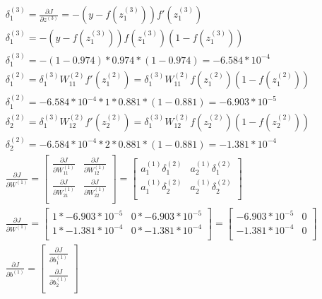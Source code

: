 \documentclass[leqno]{article}
\begin{document}
\begin{gather*}
\begin{split}
&\delta_1^{(3)} = \frac{\partial J}{\partial z^{(3)}} = -(y - f(z_1^{(3)}))f'(z_1^{(3)}) \\ 
&\delta_1^{(3)} =  -(y - f(z_1^{(3)}))f(z_1^{(3)})(1 - f(z_1^{(3)}))\\
&\delta_1^{(3)} = -(1 - 0.974)*0.974*(1 - 0.974) = -6.584*10^{-4}\\
&\delta_1^{(2)} = \delta_1^{(3)}W_{11}^{(2)}f'(z_1^{(2)}) = \delta_1^{(3)}W_{11}^{(2)}f(z_1^{(2)})(1 - f(z_1^{(2)}))\\
&\delta_1^{(2)} = -6.584*10^{-4}*1*0.881*(1 - 0.881) = -6.903*10^{-5}\\
&\delta_2^{(2)} = \delta_1^{(3)}W_{12}^{(2)}f'(z_2^{(2)}) = \delta_1^{(3)}W_{12}^{(2)}f(z_2^{(2)})(1 - f(z_2^{(2)}))\\
&\delta_2^{(2)} = -6.584*10^{-4}*2*0.881*(1 - 0.881) = -1.381*10^{-4}\\ 
&\frac{\partial J}{\partial W^{(1)}} = 
 \begin{bmatrix}
   \frac{\partial J}{\partial W_{11}^{(1)}} & \frac{\partial J}{\partial W_{12}^{(1)}}\\ 
  \frac{\partial J}{\partial W_{21}^{(1)}} & \frac{\partial J}{\partial W_{22}^{(1)}}\\
  \end{bmatrix}
   =
 \begin{bmatrix}
   a_1^{(1)}\delta_1^{(2)} & a_2^{(1)}\delta_1^{(2)}\\ 
   a_1^{(1)}\delta_2^{(2)} & a_2^{(1)}\delta_2^{(2)}\\
  \end{bmatrix}\\
& \frac{\partial J}{\partial W^{(1)}} =
  \begin{bmatrix}
   1*-6.903*10^{-5} & 0*-6.903*10^{-5}\\ 
   1*-1.381*10^{-4} & 0*-1.381*10^{-4}\\
  \end{bmatrix}
 =
  \begin{bmatrix}
   -6.903*10^{-5} & 0\\ 
   -1.381*10^{-4} & 0\\
  \end{bmatrix}
\\
&\frac{\partial J}{\partial b^{(1)}} = 
 \begin{bmatrix}
   \frac{\partial J}{\partial b_1^{(1)}}\\ 
  \frac{\partial J}{\partial b_2^{(1)}}\\

\end{bmatrix}
\end{split}
\end{gather*}
\end{document}
